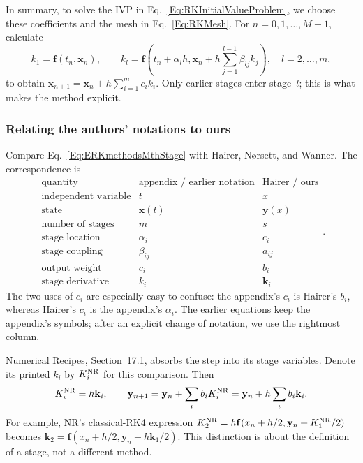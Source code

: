 In summary, to solve the IVP in Eq.~\ref{Eq:RKInitialValueProblem}, we
choose these coefficients and the mesh in Eq.~\ref{Eq:RKMesh}. For
$n=0,1,\dots,M-1$, calculate
\[
 k_1=\mathbf f(t_n,\mathbf x_n),\qquad
 k_l=\mathbf f\left(t_n+\alpha_lh,
             \mathbf x_n+h\sum_{j=1}^{l-1}\beta_{lj}k_j\right),
 \quad l=2,\dots,m,
\]
to obtain $\mathbf x_{n+1}=\mathbf x_n+h\sum_{i=1}^m c_i k_i$.
Only earlier stages enter stage~$l$; this is what makes the method explicit.

\subsubsection{Relating the authors' notations to ours}

Compare Eq.~\ref{Eq:ERKmethodsMthStage} with Hairer, N\o rsett, and Wanner.
The correspondence is
\begin{equation}\label{Eq:RKNotationDictionary}
\begin{array}{c|c|c}
 \text{quantity}&\text{appendix / earlier notation}&\text{Hairer / ours}\\ \hline
 \text{independent variable}&t&x\\
 \text{state}&\mathbf x(t)&\mathbf y(x)\\
 \text{number of stages}&m&s\\
 \text{stage location}&\alpha_i&c_i\\
 \text{stage coupling}&\beta_{ij}&a_{ij}\\
 \text{output weight}&c_i&b_i\\
 \text{stage derivative}&k_i&\mathbf k_i
\end{array}.
\end{equation}
The two uses of $c_i$ are especially easy to confuse: the appendix's
$c_i$ is Hairer's $b_i$, whereas Hairer's $c_i$ is the appendix's
$\alpha_i$. The earlier equations keep the appendix's symbols; after
an explicit change of notation, we use the rightmost column.

Numerical Recipes, Section~17.1, absorbs the step into its stage variables.
Denote its printed $k_i$ by $K_i^{\rm NR}$ for this comparison. Then
\begin{equation}\label{Eq:RKNRStages}
 K_i^{\rm NR}=h\mathbf k_i,\qquad
 \mathbf y_{n+1}=\mathbf y_n+\sum_i b_i K_i^{\rm NR}
               =\mathbf y_n+h\sum_i b_i\mathbf k_i.
\end{equation}
For example, NR's classical-RK4 expression
$K_2^{\rm NR}=h\mathbf f(x_n+h/2,\mathbf y_n+K_1^{\rm NR}/2)$
becomes $\mathbf k_2=\mathbf f(x_n+h/2,\mathbf y_n+h\mathbf k_1/2)$.
This distinction is about the definition of a stage, not a different method.

